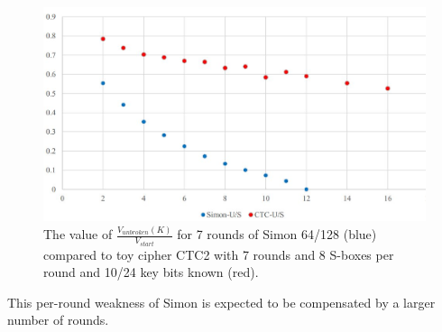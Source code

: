 \begin{figure}[h!]
	\vspace{-0.2cm}
	\centering
	\includegraphics*[width=120mm]{./pics/SimonvsCTC2_7.jpg}
	\caption{The value of $\frac{V_{unbroken}(K)}{V_{start}}$ for 7 rounds of
		Simon 64/128 (blue) compared to toy cipher CTC2 with 7 rounds
		and 8 S-boxes per round and 10/24 key bits known (red).}
	\label{CTC2StrongerThanSimon7RCurve}
	\vspace{-0.1cm}
\end{figure}

This per-round weakness of Simon is expected to be compensated by a larger number of rounds.






